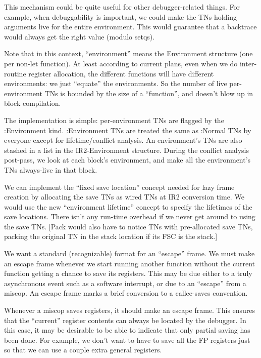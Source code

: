 This mechanism could be quite useful for other debugger-related things.  For
example, when debuggability is important, we could make the TNs holding
arguments live for the entire environment.  This would guarantee that a
backtrace would always get the right value (modulo setqs).  

Note that in this context, ``environment'' means the Environment structure (one
per non-let function).  At least according to current plans, even when we do
inter-routine register allocation, the different functions will have different
environments: we just ``equate'' the environments.  So the number of live
per-environment TNs is bounded by the size of a ``function'', and doesn't blow up
in block compilation.

The implementation is simple: per-environment TNs are flagged by the
:Environment kind.  :Environment TNs are treated the same as :Normal TNs by
everyone except for lifetime/conflict analysis.  An environment's TNs are also
stashed in a list in the IR2-Environment structure.  During the conflict
analysis post-pass, we look at each block's environment, and make all the
environment's TNs always-live in that block.

We can implement the ``fixed save location'' concept needed for lazy frame
creation by allocating the save TNs as wired TNs at IR2 conversion time.  We
would use the new ``environment lifetime'' concept to specify the lifetimes of
the save locations.  There isn't any run-time overhead if we never get around
to using the save TNs.  [Pack would also have to notice TNs with pre-allocated
save TNs, packing the original TN in the stack location if its FSC is the
stack.]


We want a standard (recognizable) format for an ``escape'' frame.  We must make
an escape frame whenever we start running another function without the current
function getting a chance to save its registers.  This may be due either to a
truly asynchronous event such as a software interrupt, or due to an ``escape''
from a miscop.  An escape frame marks a brief conversion to a callee-saves
convention.

Whenever a miscop saves registers, it should make an escape frame.  This
ensures that the ``current'' register contents can always be located by the
debugger.  In this case, it may be desirable to be able to indicate that only
partial saving has been done.  For example, we don't want to have to save all
the FP registers just so that we can use a couple extra general registers.

